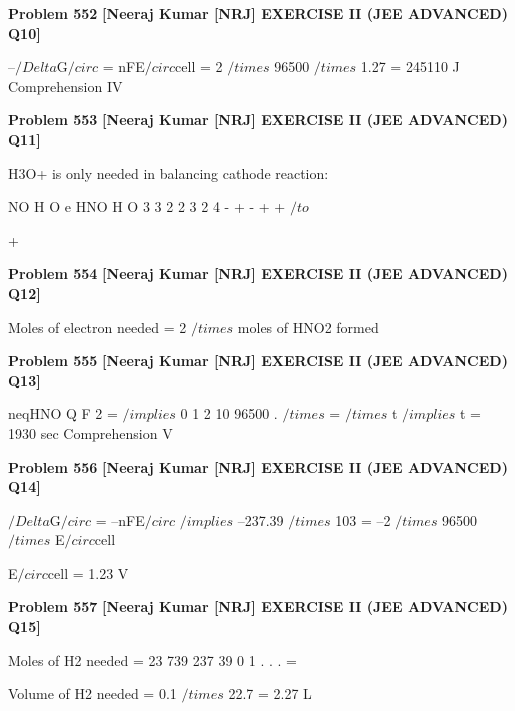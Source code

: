 \begin{problembox}
\textbf{Problem 552} \hfill \textbf{[Neeraj Kumar [NRJ] EXERCISE II (JEE ADVANCED) Q10]}
\label{q:ext-nrj_all_questions-552}

--$/Delta$G$/circ$ = nFE$/circ$cell = 2 $/times$ 96500 $/times$ 1.27 = 245110 J
Comprehension IV
\end{problembox}

\begin{problembox}
\textbf{Problem 553} \hfill \textbf{[Neeraj Kumar [NRJ] EXERCISE II (JEE ADVANCED) Q11]}
\label{q:ext-nrj_all_questions-553}

H3O+ is only needed in balancing cathode reaction:
 
 
NO
H O
e
HNO
H O
3
3
2
2
3
2
4
-
+
-
+
+
 $/to$
 
+
\end{problembox}

\begin{problembox}
\textbf{Problem 554} \hfill \textbf{[Neeraj Kumar [NRJ] EXERCISE II (JEE ADVANCED) Q12]}
\label{q:ext-nrj_all_questions-554}

Moles of electron needed = 2 $/times$ moles of HNO2 
formed
\end{problembox}

\begin{problembox}
\textbf{Problem 555} \hfill \textbf{[Neeraj Kumar [NRJ] EXERCISE II (JEE ADVANCED) Q13]}
\label{q:ext-nrj_all_questions-555}

neqHNO
Q
F
2 =
 $/implies$ 0 1
2
10
96500
. $/times$
=
$/times$ t $/implies$ t = 1930 sec
Comprehension V
\end{problembox}

\begin{problembox}
\textbf{Problem 556} \hfill \textbf{[Neeraj Kumar [NRJ] EXERCISE II (JEE ADVANCED) Q14]}
\label{q:ext-nrj_all_questions-556}

$/Delta$G$/circ$ = --nFE$/circ$ $/implies$ --237.39 $/times$ 103 = --2 $/times$ 96500 $/times$ E$/circ$cell
 
   E$/circ$cell = 1.23 V
\end{problembox}

\begin{problembox}
\textbf{Problem 557} \hfill \textbf{[Neeraj Kumar [NRJ] EXERCISE II (JEE ADVANCED) Q15]}
\label{q:ext-nrj_all_questions-557}

Moles of H2 needed = 23 739
237 39
0 1
.
.
.
=
 
   Volume of H2 needed = 0.1 $/times$ 22.7 = 2.27 L
\end{problembox}

